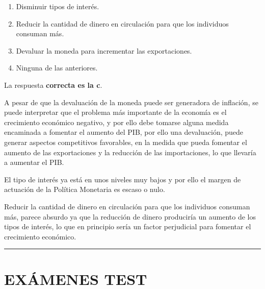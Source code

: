 \documentclass[
  letterpaper,
  DIV=11,
  numbers=noendperiod]{scrreprt}
\begin{document}
\begin{enumerate}
\def\labelenumi{\alph{enumi})}
\item
  Disminuir tipos de interés.
\item
  Reducir la cantidad de dinero en circulación para que los individuos
  consuman más.
\item
  Devaluar la moneda para incrementar las exportaciones.
\item
  Ninguna de las anteriores.
\end{enumerate}

\begin{tcolorbox}[enhanced jigsaw, left=2mm, breakable, arc=.35mm, opacityback=0, toprule=.15mm, rightrule=.15mm, leftrule=.75mm, bottomrule=.15mm, colframe=quarto-callout-tip-color-frame, colback=white]
\begin{minipage}[t]{5.5mm}
\textcolor{quarto-callout-tip-color}{\faLightbulb}
\end{minipage}%
\begin{minipage}[t]{\textwidth - 5.5mm}

La respuesta \textbf{correcta es la c}.

A pesar de que la devaluación de la moneda puede ser generadora de
inflación, se puede interpretar que el problema más importante de la
economía es el crecimiento económico negativo, y por ello debe tomarse
alguna medida encaminada a fomentar el aumento del PIB, por ello una
devaluación, puede generar aspectos competitivos favorables, en la
medida que pueda fomentar el aumento de las exportaciones y la reducción
de las importaciones, lo que llevaría a aumentar el PIB.

El tipo de interés ya está en unos niveles muy bajos y por ello el
margen de actuación de la Política Monetaria es escaso o nulo.

Reducir la cantidad de dinero en circulación para que los individuos
consuman más, parece absurdo ya que la reducción de dinero produciría un
aumento de los tipos de interés, lo que en principio sería un factor
perjudicial para fomentar el crecimiento económico.

\end{minipage}%
\end{tcolorbox}

\begin{center}\rule{0.5\linewidth}{0.5pt}\end{center}

\part{EXÁMENES TEST}
\end{document}
